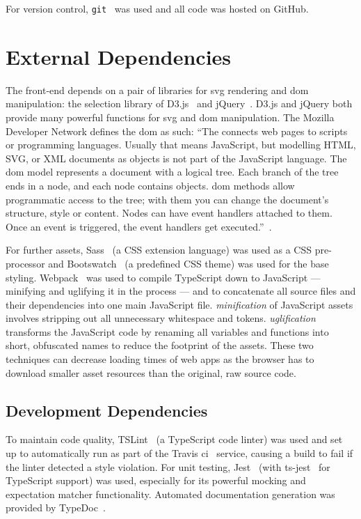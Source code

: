 \documentclass[nobib, a4paper, twoside, justified]{tufte-book}
\makeatletter
\newcommand{\svg}{\gls{svg}\@\xspace}
\newcommand{\dom}{\gls{dom}\@\xspace}
\makeatother
\begin{document}
For version control, \texttt{git}~\autocite{git} was used and all code was hosted on GitHub.

\section{External Dependencies}%
\label{sec:external_dependencies}

The front-end depends on a pair of libraries for \svg rendering and \dom manipulation: the
selection library of D3.js~\autocite{d3js} and jQuery~\autocite{jquery}. D3.js and jQuery both
provide many powerful functions for \svg and \dom manipulation. The Mozilla Developer Network
defines the \dom as such: ``The  connects web pages to scripts or programming
languages. Usually that means JavaScript, but modelling HTML, SVG, or XML documents as objects is
not part of the JavaScript language. The \dom model represents a document with a logical tree.
Each branch of the tree ends in a node, and each node contains objects. \dom methods allow
programmatic access to the tree; with them you can change the document's structure, style or
content. Nodes can have event handlers attached to them. Once an event is triggered, the event
handlers get executed.''~\autocite{mdn_dom}.

For further assets, Sass~\autocite{sass-lang} (a CSS extension language) was used as a CSS
pre-processor and Bootswatch~\autocite{bootswatch-flatly} (a predefined CSS theme) was used for the
base styling.  Webpack~\autocite{webpack} was used to compile TypeScript down to JavaScript ---
minifying and uglifying it in the process --- and to concatenate all source files and their
dependencies into one main JavaScript file. \textit{\Gls{minification}} of JavaScript assets
involves stripping out all unnecessary whitespace and tokens.  \textit{\Gls{uglification}}
transforms the JavaScript code by renaming all variables and functions into short, obfuscated names
to reduce the footprint of the assets. These two techniques can decrease loading times of web apps
as the browser has to download smaller asset resources than the original, raw source code.

\subsection{Development Dependencies}%
\label{sub:development_dependencies}

To maintain code quality, TSLint~\autocite{tslint} (a TypeScript code linter) was used and set up to
automatically run as part of the Travis \gls{ci}~\autocite{travis} service, causing a build to fail
if the linter detected a style violation. For unit testing, Jest~\autocite{jest} (with
ts-jest~\autocite{ts-jest} for TypeScript support) was used, especially for its powerful mocking
and expectation matcher functionality. Automated documentation generation was provided by
TypeDoc~\autocite{typedoc}.
\end{document}
